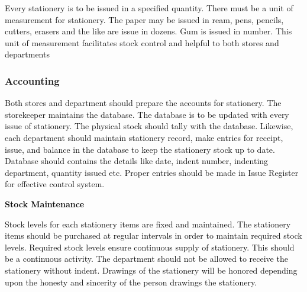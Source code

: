 \documentclass[12pt]{report}
\renewcommand{\_}{\kern-1.5pt\textunderscore\kern-1.5pt}
\begin{document}
\begin{adjustwidth}{0.2in}{0.84in}
\textcolor[HTML]{0D0D0D}{Every stationery is to be issued in a specified quantity. There must be a unit of measurement for stationery. The paper may be issued in ream, pens, pencils, cutters, erasers and the like are issue in dozens. Gum is issued in number. This unit of measurement facilitates stock control and helpful to both stores and departments}\par

\end{adjustwidth}


\vspace{\baselineskip}
\begin{adjustwidth}{0.2in}{0.84in}
\subsubsection*{Accounting}
\end{adjustwidth}

\begin{adjustwidth}{0.2in}{0.84in}
\textcolor[HTML]{0D0D0D}{Both stores and department should prepare the accounts for stationery. The storekeeper maintains the database. The database is to be updated with every issue of stationery. The physical stock should tally with the database. Likewise, each department should maintain stationery record, make entries for receipt, issue, and balance in the database to keep the stationery stock up to date. Database should contains the details like date, indent number, indenting department, quantity issued etc. Proper entries should be made in Issue Register for effective control system.}\par

\end{adjustwidth}


\vspace{\baselineskip}
\begin{adjustwidth}{0.2in}{0.84in}
\begin{justify}
{\fontsize{14pt}{16.8pt}\selectfont \textbf{\textcolor[HTML]{0D0D0D}{Stock Maintenance}}\par}
\end{justify}\par

\end{adjustwidth}

\begin{adjustwidth}{0.2in}{0.84in}
\begin{justify}
\textcolor[HTML]{0D0D0D}{Stock levels for each stationery items are fixed and maintained. The stationery items should be purchased at regular intervals in order to maintain required stock levels. Required stock levels ensure continuous supply of stationery. This should be a continuous activity. The department should not be allowed to receive the stationery without indent. Drawings of the stationery will be honored depending upon the honesty and sincerity of the person drawings the stationery.}
\end{justify}\par

\end{adjustwidth}
\end{document}
